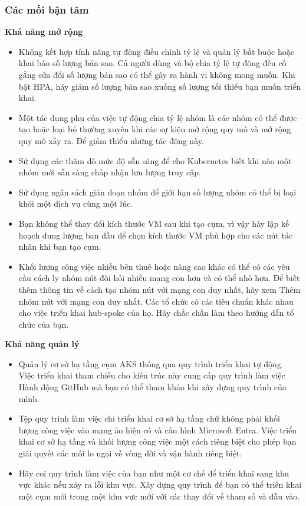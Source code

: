 \subsubsection{Các mối bận tâm}
\textbf{Khả năng mở rộng}
    \begin{itemize}
        \item Không kết hợp tính năng tự động điều chỉnh tỷ lệ và quản lý bắt buộc hoặc khai báo số lượng bản sao. Cả người dùng và bộ chia tỷ lệ tự động đều cố gắng sửa đổi số lượng bản sao có thể gây ra hành vi không mong muốn. Khi bật HPA, hãy giảm số lượng bản sao xuống số lượng tối thiểu bạn muốn triển khai.
        \item Một tác dụng phụ của việc tự động chia tỷ lệ nhóm là các nhóm có thể được tạo hoặc loại bỏ thường xuyên khi các sự kiện mở rộng quy mô và mở rộng quy mô xảy ra. Để giảm thiểu những tác động này.
        \item Sử dụng các thăm dò mức độ sẵn sàng để cho Kubernetes biết khi nào một nhóm mới sẵn sàng chấp nhận lưu lượng truy cập.
        \item Sử dụng ngân sách gián đoạn nhóm để giới hạn số lượng nhóm có thể bị loại khỏi một dịch vụ cùng một lúc.
        \item Bạn không thể thay đổi kích thước VM sau khi tạo cụm, vì vậy hãy lập kế hoạch dung lượng ban đầu để chọn kích thước VM phù hợp cho các nút tác nhân khi bạn tạo cụm.
        \item Khối lượng công việc nhiều bên thuê hoặc nâng cao khác có thể có các yêu cầu cách ly nhóm nút đòi hỏi nhiều mạng con hơn và có thể nhỏ hơn. Để biết thêm thông tin về cách tạo nhóm nút với mạng con duy nhất, hãy xem Thêm nhóm nút với mạng con duy nhất. Các tổ chức có các tiêu chuẩn khác nhau cho việc triển khai hub-spoke của họ. Hãy chắc chắn làm theo hướng dẫn tổ chức của bạn. 
    \end{itemize}
\textbf{Khả năng quản lý}
    \begin{itemize}
        \item Quản lý cơ sở hạ tầng cụm AKS thông qua quy trình triển khai tự động. Việc triển khai tham chiếu cho kiến trúc này cung cấp quy trình làm việc Hành động GitHub mà bạn có thể tham khảo khi xây dựng quy trình của mình.
        \item Tệp quy trình làm việc chỉ triển khai cơ sở hạ tầng chứ không phải khối lượng công việc vào mạng ảo hiện có và cấu hình Microsoft Entra. Việc triển khai cơ sở hạ tầng và khối lượng công việc một cách riêng biệt cho phép bạn giải quyết các mối lo ngại về vòng đời và vận hành riêng biệt.
        \item Hãy coi quy trình làm việc của bạn như một cơ chế để triển khai sang khu vực khác nếu xảy ra lỗi khu vực. Xây dựng quy trình để bạn có thể triển khai một cụm mới trong một khu vực mới với các thay đổi về tham số và đầu vào. 
    \end{itemize}
